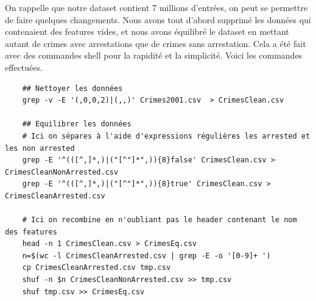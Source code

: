 \documentclass{article}
\begin{document}
    On rappelle que notre dataset contient 7 millions d'entrées, on peut se permettre
    de faire quelques changements.
    Nous avons tout d'abord supprimé les données qui contenaient des features vides,
    et nous avons équilibré le dataset en mettant autant de crimes avec arrestations 
    que de crimes sans arrestation.
    Cela a été fait avec des commandes shell pour la rapidité et la simplicité. 
    Voici les commandes effectuées.

    \begin{Verbatim}
    ## Nettoyer les données
    grep -v -E '(,0,0,2)|(,,)' Crimes2001.csv  > CrimesClean.csv
    
    ## Equilibrer les données
    # Ici on sépares à l'aide d'expressions régulières les arrested et les non arrested
    grep -E '^(([^,]*,)|("[^"]*",)){8}false' CrimesClean.csv > CrimesCleanNonArrested.csv
    grep -E '^(([^,]*,)|("[^"]*",)){8}true' CrimesClean.csv > CrimesCleanArrested.csv
 
    # Ici on recombine en n'oubliant pas le header contenant le nom des features
    head -n 1 CrimesClean.csv > CrimesEq.csv
    n=$(wc -l CrimesCleanArrested.csv | grep -E -o '[0-9]+ ')
    cp CrimesCleanArrested.csv tmp.csv
    shuf -n $n CrimesCleanNonArrested.csv >> tmp.csv
    shuf tmp.csv >> CrimesEq.csv
    \end{Verbatim}
\end{document}
